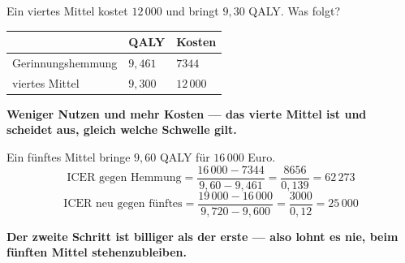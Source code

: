 \begin{aufgabe}
Ein viertes Mittel kostet $12\,000$ und bringt $9{,}30$ QALY. Was folgt?

\loesung
{}
\begin{center}
{\small
\renewcommand{\arraystretch}{1.48}
\begin{tabular}{@{}P{3.4cm}P{1.8cm}P{2.0cm}@{}}
\toprule
& \textbf{QALY} & \textbf{Kosten}\\
\midrule
Gerinnungshemmung & $9{,}461$ & $7344$\\
viertes Mittel & $9{,}300$ & $12\,000$\\
\bottomrule
\end{tabular}}
\end{center}

\begin{center}
\begin{minipage}{0.9\textwidth}
\textbf{Weniger Nutzen und mehr Kosten --- das vierte Mittel ist  und scheidet aus, gleich welche Schwelle gilt.}
\end{minipage}
\end{center}

Ein fünftes Mittel bringe $9{,}60$ QALY für $16\,000$ Euro.
\[ \text{ICER gegen Hemmung} = \frac{16\,000-7344}{9{,}60-9{,}461} = \frac{8656}{0{,}139} = 62\,273 \]
\[ \text{ICER neu gegen fünftes} = \frac{19\,000-16\,000}{9{,}720-9{,}600} = \frac{3000}{0{,}12} = 25\,000 \]

\begin{center}
\begin{minipage}{0.9\textwidth}
\textbf{Der zweite Schritt ist billiger als der erste --- also lohnt es nie, beim fünften Mittel stehenzubleiben.}
\end{minipage}
\end{center}

\begin{center}
\begin{minipage}{0.88\textwidth}
\end{minipage}
\end{center}
\end{aufgabe}

